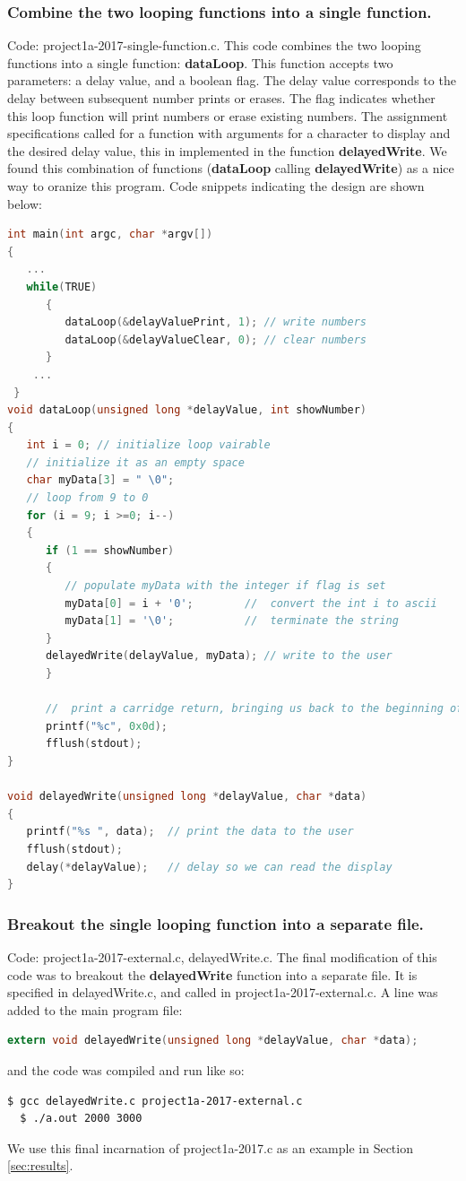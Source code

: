 \documentclass[letterpaper, 12pt]{article}
\begin{document}
\subsubsection{Combine the two looping functions into a single function.}
Code: project1a-2017-single-function.c.  This code combines the two looping functions into a single function: \textbf{dataLoop}.  This function accepts two parameters: a delay value, and a boolean flag.  The delay value corresponds to the delay between subsequent number prints or erases.  The flag indicates whether this loop function will print numbers or erase existing numbers.  The assignment specifications called for a function with arguments for a character to display and the desired delay value, this in implemented in the function \textbf{delayedWrite}.   We found this combination of functions (\textbf{dataLoop} calling \textbf{delayedWrite}) as a nice way to oranize this program.  Code snippets indicating the design are shown below:
\begin{lstlisting}[language=C]
int main(int argc, char *argv[])
{
   ...
   while(TRUE)
      {
         dataLoop(&delayValuePrint, 1); // write numbers
         dataLoop(&delayValueClear, 0); // clear numbers
      }
    ...
 }
void dataLoop(unsigned long *delayValue, int showNumber)
{
   int i = 0; // initialize loop vairable
   // initialize it as an empty space
   char myData[3] = " \0";
   // loop from 9 to 0
   for (i = 9; i >=0; i--)
   {
      if (1 == showNumber)
      {
         // populate myData with the integer if flag is set
         myData[0] = i + '0';        //  convert the int i to ascii
         myData[1] = '\0';           //  terminate the string
      }
      delayedWrite(delayValue, myData); // write to the user
      }

      //  print a carridge return, bringing us back to the beginning of the output line
      printf("%c", 0x0d);
      fflush(stdout);
}

void delayedWrite(unsigned long *delayValue, char *data)
{
   printf("%s ", data);  // print the data to the user
   fflush(stdout);
   delay(*delayValue);   // delay so we can read the display
}
\end{lstlisting}


\subsubsection{Breakout the single looping function into a separate file.}
Code: project1a-2017-external.c, delayedWrite.c.  The  final modification of this code was to breakout  the \textbf{delayedWrite} function into a  separate file.   It is specified in delayedWrite.c, and  called in project1a-2017-external.c.  A line was added to  the main program file:
\begin{lstlisting}[language=C]
extern void delayedWrite(unsigned long *delayValue, char *data);
\end{lstlisting}
and the  code was compiled and run like so:
\begin{lstlisting}[language=bash]
  $ gcc delayedWrite.c project1a-2017-external.c
  $ ./a.out 2000 3000
\end{lstlisting}
We use this final incarnation of project1a-2017.c as an example in Section \ref{sec:results}.
\end{document}
